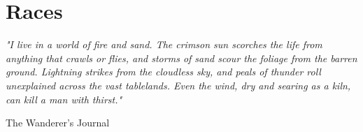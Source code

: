 \chapter{Races}\label{chap:races}

\epigraph{\textit{
    "I live in a world of fire and sand. The crimson sun scorches the life from anything that crawls or flies, and storms of sand
    scour the foliage from the barren ground. Lightning strikes from the cloudless sky, and peals of thunder roll unexplained
    across the vast tablelands. Even the wind, dry and searing as a kiln, can kill a man with thirst."
} }{ The Wanderer’s Journal }

\begin{multicols}{2}










\end{multicols}
